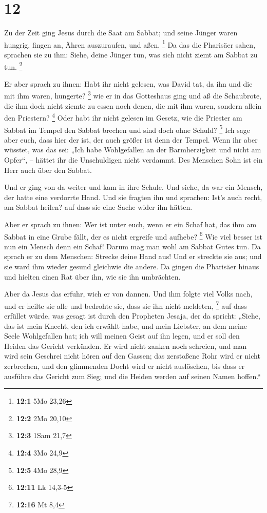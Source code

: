 \hypertarget{section-8}{%
\section{12}\label{section-8}}

 Zu der Zeit ging Jesus durch die Saat am Sabbat; und
seine Jünger waren hungrig, fingen an, Ähren auszuraufen, und aßen.
\footnote{\textbf{12:1} 5Mo 23,26}  Da das die Pharisäer
sahen, sprachen sie zu ihm: Siehe, deine Jünger tun, was sich nicht
ziemt am Sabbat zu tun. \footnote{\textbf{12:2} 2Mo 20,10}

 Er aber sprach zu ihnen: Habt ihr nicht gelesen, was
David tat, da ihn und die mit ihm waren, hungerte? \footnote{\textbf{12:3}
  1Sam 21,7}  wie er in das Gotteshaus ging und aß die
Schaubrote, die ihm doch nicht ziemte zu essen noch denen, die mit ihm
waren, sondern allein den Priestern? \footnote{\textbf{12:4} 3Mo 24,9}
 Oder habt ihr nicht gelesen im Gesetz, wie die Priester
am Sabbat im Tempel den Sabbat brechen und sind doch ohne Schuld?
\footnote{\textbf{12:5} 4Mo 28,9}  Ich sage aber euch,
dass hier der ist, der auch größer ist denn der Tempel. 
Wenn ihr aber wüsstet, was das sei: „Ich habe Wohlgefallen an der
Barmherzigkeit und nicht am Opfer``, -- hättet ihr die Unschuldigen
nicht verdammt.  Des Menschen Sohn ist ein Herr auch über
den Sabbat.

 Und er ging von da weiter und kam in ihre Schule.
 Und siehe, da war ein Mensch, der hatte eine verdorrte
Hand. Und sie fragten ihn und sprachen: Ist's auch recht, am Sabbat
heilen? auf dass sie eine Sache wider ihn hätten.

 Aber er sprach zu ihnen: Wer ist unter euch, wenn er ein
Schaf hat, das ihm am Sabbat in eine Grube fällt, der es nicht ergreife
und aufhebe? \footnote{\textbf{12:11} Lk 14,3-5}  Wie
viel besser ist nun ein Mensch denn ein Schaf! Darum mag man wohl am
Sabbat Gutes tun.  Da sprach er zu dem Menschen: Strecke
deine Hand aus! Und er streckte sie aus; und sie ward ihm wieder gesund
gleichwie die andere.  Da gingen die Pharisäer hinaus und
hielten einen Rat über ihn, wie sie ihn umbrächten.

 Aber da Jesus das erfuhr, wich er von dannen. Und ihm
folgte viel Volks nach, und er heilte sie alle  und
bedrohte sie, dass sie ihn nicht meldeten, \footnote{\textbf{12:16} Mt
  8,4}  auf dass erfüllet würde, was gesagt ist durch den
Propheten Jesaja, der da spricht:  „Siehe, das ist mein
Knecht, den ich erwählt habe, und mein Liebster, an dem meine Seele
Wohlgefallen hat; ich will meinen Geist auf ihn legen, und er soll den
Heiden das Gericht verkünden.  Er wird nicht zanken noch
schreien, und man wird sein Geschrei nicht hören auf den Gassen;
 das zerstoßene Rohr wird er nicht zerbrechen, und den
glimmenden Docht wird er nicht auslöschen, bis dass er ausführe das
Gericht zum Sieg;  und die Heiden werden auf seinen Namen
hoffen.``

